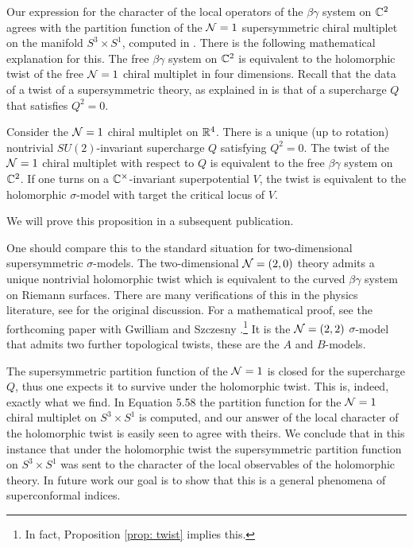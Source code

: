 Our expression for the character of the local operators of the $\beta\gamma$ system on $\mathbb C^2$ agrees with the partition function of the $\mathcal N = 1$ supersymmetric chiral multiplet on the manifold $S^3 \times S^1$, computed in \cite{Closset1}.
There is the following mathematical explanation for this.
The free $\beta\gamma$ system on $\mathbb C^2$ is equivalent to the holomorphic twist of the free $\mathcal N=1$ chiral multiplet in four dimensions. 
Recall that the data of a twist of a supersymmetric theory, as explained in \cite{CostelloHolomorphic} is that of a supercharge $Q$ that satisfies $Q^2 = 0$. 

\begin{prop}\label{prop: twist}
Consider the $\mathcal N = 1$ chiral multiplet on $\mathbb R^4$.
There is a unique (up to rotation) nontrivial $SU(2)$-invariant supercharge $Q$ satisfying $Q^2 = 0$. 
The twist of the $\mathcal N=1$ chiral multiplet with respect to $Q$ is equivalent to the free $\beta\gamma$ system on $\mathbb C^2$.
If one turns on a $\mathbb C^\times$-invariant superpotential $V$, the twist is equivalent to the holomorphic $\sigma$-model with target the critical locus of $V$.
\end{prop}

We will prove this proposition in a subsequent publication.

\begin{rmk}
One should compare this to the standard situation for two-dimensional supersymmetric $\sigma$-models.
The two-dimensional $\mathcal N = (2,0)$ theory admits a unique nontrivial holomorphic twist which is equivalent to the curved $\beta\gamma$ system on Riemann surfaces. 
There are many verifications of this in the physics literature, see \cite{WittenCDO} for the original discussion. 
For a mathematical proof, see the forthcoming paper with Gwilliam and Szczesny \cite{GSW}.\footnote{In fact, Proposition \ref{prop: twist} implies this.}
It is the $\mathcal N = (2,2)$ $\sigma$-model that admits two further topological twists, these are the $A$ and $B$-models.
\end{rmk}

The supersymmetric partition function of the $\mathcal N=1$ is closed for the supercharge $Q$, thus one expects it to survive under the holomorphic twist.
This is, indeed, exactly what we find.
In \cite{Closset1} Equation 5.58 the partition function for the $\mathcal N=1$ chiral multiplet on $S^3 \times S^1$ is computed, and our answer of the local character of the holomorphic twist is easily seen to agree with theirs. 
We conclude that in this instance that under the holomorphic twist the supersymmetric partition function on $S^3 \times S^1$ was sent to the character of the local observables of the holomorphic theory. 
In future work our goal is to show that this is a general phenomena of superconformal indices.

